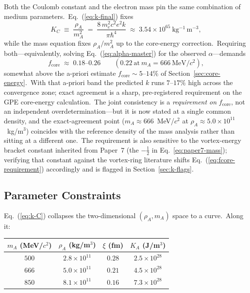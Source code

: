\documentclass[12pt,letterpaper]{article}
\newcommand{\rhoa}{\rho_{\!A}}
\newcommand{\Ka}{K_{\!A}}
\begin{document}
Both the Coulomb constant and the electron mass pin the same combination
of medium parameters.\ Eq.~(\ref{eq:k-final}) fixes
%
\begin{equation}
  K_C \;\equiv\; \frac{\rhoa}{m_A^2}
  \;=\; \frac{8\, m_e^2 c^2 e^2 k}{\pi \hbar^4}
  \;\approx\; 3.54 \times 10^{65}\ \mathrm{kg^{-1}\,m^{-3}},
  \label{eq:k-C}
\end{equation}
%
while the mass equation fixes $\rhoa/m_A^2$ up to the core-energy
correction.\ Requiring both---equivalently, solving
Eq.~(\ref{eq:alpha-master}) for the observed $\alpha$---demands
%
\begin{equation}
  f_{\mathrm{core}} \;\approx\; 0.18\text{--}0.26
  \qquad (0.22\ \text{at}\ m_A = 666\ \mathrm{MeV}/c^2),
  \label{eq:fcore-requirement}
\end{equation}
%
somewhat above the a-priori estimate
$f_{\mathrm{core}} \sim 5$--$14\%$ of Section~\ref{sec:core-energy}.\
With that a-priori band the predicted $k$ runs $7$--$17\%$ high across
the convergence zone; exact agreement is a sharp, pre-registered
requirement on the GPE core-energy calculation.\ The joint consistency
is a \emph{requirement on} $f_{\mathrm{core}}$, not an independent
overdetermination---but it is now stated at a single common density, and
the exact-agreement point ($m_A \approx 666$~MeV/$c^2$ at
$\rhoa \approx 5.0\times10^{11}$~kg/m$^3$) coincides with the reference
density of the mass analysis rather than sitting at a different one.\
The requirement is also sensitive to the vortex-energy bracket constant
inherited from Paper~7 (the $-\tfrac12$ in Eq.~\ref{eq:paper7-mass});
verifying that constant against the vortex-ring literature shifts
Eq.~(\ref{eq:fcore-requirement}) accordingly and is flagged in
Section~\ref{sec:k-flags}.

\subsection{Parameter Constraints}
\label{sec:k-tightened}

Eq.~(\ref{eq:k-C}) collapses the two-dimensional $(\rhoa, m_A)$ space to
a curve.\ Along it:

\begin{center}
\begin{tabular}{@{}cccc@{}}
\toprule
$m_A$ (MeV/$c^2$) & $\rhoa$ (kg/m$^3$) & $\xi$ (fm) & $\Ka$ (J/m$^3$) \\
\midrule
$500$ & $2.8\times10^{11}$ & $0.28$ & $2.5\times10^{28}$ \\
$666$ & $5.0\times10^{11}$ & $0.21$ & $4.5\times10^{28}$ \\
$850$ & $8.1\times10^{11}$ & $0.16$ & $7.3\times10^{28}$ \\
\bottomrule
\end{tabular}
\end{center}
\end{document}

